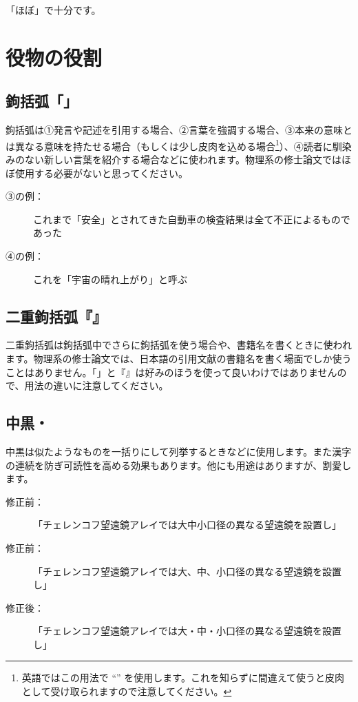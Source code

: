 「ほぼ」で十分です。

\section{役物の役割}

\subsection{鉤括弧「」}

鉤括弧は①発言や記述を引用する場合、②言葉を強調する場合、③本来の意味とは異なる意味を持たせる場合（もしくは少し皮肉を込める場合\footnote{英語ではこの用法で ``'' を使用します。これを知らずに間違えて使うと皮肉として受け取られますので注意してください。}）、④読者に馴染みのない新しい言葉を紹介する場合などに使われます。物理系の修士論文ではほぼ使用する必要がないと思ってください。

\begin{description}
\item[③の例：]これまで「安全」とされてきた自動車の検査結果は全て不正によるものであった
\item[④の例：]これを「宇宙の晴れ上がり」と呼ぶ
\end{description}

\subsection{二重鉤括弧『』}

二重鉤括弧は鉤括弧中でさらに鉤括弧を使う場合や、書籍名を書くときに使われます。物理系の修士論文では、日本語の引用文献の書籍名を書く場面でしか使うことはありません。「」と『』は好みのほうを使って良いわけではありませんので、用法の違いに注意してください。

\subsection{中黒・}

中黒は似たようなものを一括りにして列挙するときなどに使用します。また漢字の連続を防ぎ可読性を高める効果もあります。他にも用途はありますが、割愛します。

\begin{description}
\item[修正前：]「チェレンコフ望遠鏡アレイでは大中小口径の異なる望遠鏡を設置し」
\item[修正前：]「チェレンコフ望遠鏡アレイでは大、中、小口径の異なる望遠鏡を設置し」
\item[修正後：]「チェレンコフ望遠鏡アレイでは大・中・小口径の異なる望遠鏡を設置し」
\end{description}


